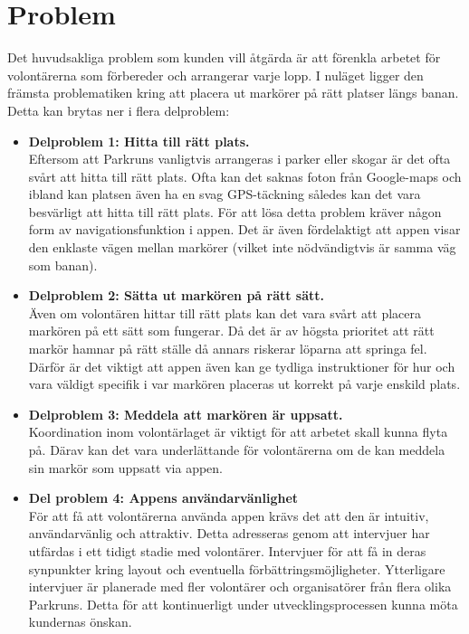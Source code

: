 \section{Problem}
Det huvudsakliga problem som kunden vill åtgärda är att förenkla arbetet för volontärerna som förbereder och arrangerar varje lopp. I nuläget ligger den främsta problematiken kring att placera ut markörer på rätt platser längs banan. Detta kan brytas ner i flera delproblem:
\begin{itemize}
    \item \textbf{Delproblem 1: Hitta till rätt plats.}\\
        Eftersom att Parkruns vanligtvis arrangeras i parker eller skogar är det ofta svårt att hitta till rätt plats. Ofta kan det saknas foton från Google-maps och ibland kan platsen även ha en svag GPS-täckning således kan det vara besvärligt att hitta till rätt plats. 
        För att lösa detta problem kräver någon form av navigationsfunktion i appen. Det är även fördelaktigt att appen visar den enklaste vägen mellan markörer (vilket inte nödvändigtvis är samma väg som banan).  
    \item \textbf{Delproblem 2: Sätta ut markören på rätt sätt.}\\
        Även om volontären hittar till rätt plats kan det vara svårt att placera markören på ett sätt som fungerar. Då det är av högsta prioritet att rätt markör hamnar på rätt ställe då annars riskerar löparna att springa fel. Därför är det viktigt att appen även kan ge tydliga instruktioner för hur och vara väldigt specifik i var markören placeras ut korrekt på varje enskild plats. 

    \item \textbf{Delproblem 3: Meddela att markören är uppsatt.}\\
        Koordination inom volontärlaget är viktigt för att arbetet skall kunna flyta på. Därav kan det vara underlättande för volontärerna om de kan meddela sin markör som uppsatt via appen.

    \item \textbf{Del problem 4: Appens användarvänlighet} \\
    För att få att volontärerna använda  appen krävs det att den är intuitiv, användarvänlig och attraktiv. Detta adresseras genom att intervjuer har utfärdas i ett tidigt stadie med volontärer. Intervjuer för att få in deras synpunkter kring layout och eventuella förbättringsmöjligheter. Ytterligare intervjuer är planerade med fler volontärer och organisatörer från flera olika Parkruns. Detta för att kontinuerligt under utvecklingsprocessen kunna möta kundernas önskan.


\end{itemize}
